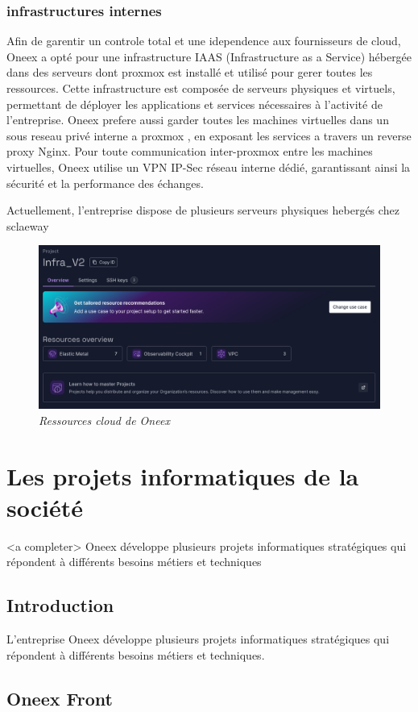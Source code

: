 \subsubsection{infrastructures internes}

Afin de garentir un controle total et une idependence aux fournisseurs de cloud, Oneex a opté pour une infrastructure IAAS (Infrastructure as a Service) hébergée dans des serveurs dont proxmox est installé et utilisé pour gerer toutes les ressources. Cette infrastructure est composée de serveurs physiques et virtuels, permettant de déployer les applications et services nécessaires à l’activité de l’entreprise.
Oneex prefere aussi garder toutes les machines virtuelles dans un sous reseau privé interne a proxmox , en exposant les services a travers un reverse proxy Nginx.
Pour toute communication inter-proxmox entre les machines virtuelles, Oneex utilise un VPN IP-Sec réseau interne dédié, garantissant ainsi la sécurité et la performance des échanges.

Actuellement, l'entreprise dispose de plusieurs serveurs physiques hebergés chez sclaeway
\begin{figure} [H]
	\centering
	\includegraphics[width=.5\textwidth]{figures/Ressources cloud.png}
	\caption{\textit{Ressources cloud de Oneex}}
	\label{fig:Ressources cloud de Oneex}
\end{figure}
\section{Les projets informatiques de la société}
<a completer>
Oneex développe plusieurs projets informatiques stratégiques qui répondent à différents besoins métiers et techniques
\subsection{Introduction}

L’entreprise Oneex développe plusieurs projets informatiques stratégiques qui répondent à différents besoins métiers et techniques.

\subsection{Oneex Front}

